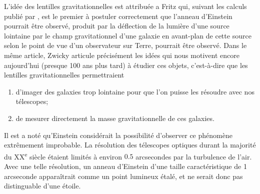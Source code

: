 L'idée des lentilles gravitationnelles est attribuée a Fritz \citet{Zwicky1937} 
qui, suivant les calculs publié par \citet{Einstein1936}, 
est le premier à postuler correctement que l'anneau d'Einstein pourrait être observé, produit par la déflection 
de la lumière d'une source lointaine par le champ gravitationnel d'une galaxie 
en avant-plan de cette source selon le point de vue d'un observateur sur Terre, 
pourrait être observé. 
Dans le même article, Zwicky articule précisément les idées qui nous motivent encore aujourd'hui 
(presque 100 ans plus tard) à étudier ces objets, 
c'est-à-dire que les lentilles gravitationnelles permettraient
\begin{enumerate}
        \item d'imager des galaxies trop lointaine pour que l'on puisse les résoudre avec 
                nos télescopes;
        \item de mesurer directement la masse gravitationnelle de ces galaxies.
\end{enumerate}
Il est a noté qu'Einstein considérait la possibilité d'observer ce phénomène extrêmement improbable. 
La résolution des télescopes optiques durant la majorité du XX\textsuperscript{e} siècle étaient 
limités à environ $ 0.5$ arcsecondes par la turbulence de 
l'air. Avec une telle résolution, un anneau d'Einstein d'une taille caractéristique de 1 arcseconde 
apparaîtrait comme un point lumineux étalé, et ne serait donc pas distinguable d'une étoile. 



